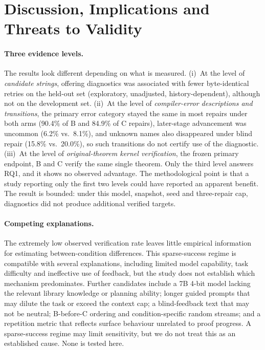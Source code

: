 \documentclass[runningheads,a4paper]{llncs}
\begin{document}
\section{Discussion, Implications and Threats to Validity}
\paragraph{Three evidence levels.} The results look different depending on what is
measured. (i)~At the level of \emph{candidate strings}, offering diagnostics was
associated with fewer byte-identical retries on the held-out set (exploratory,
unadjusted, history-dependent), although not on the development set. (ii)~At the
level of \emph{compiler-error descriptions and transitions}, the primary error category stayed the same in most repairs under both arms (90.4\% of B and 84.9\% of C repairs), later-stage advancement was uncommon (6.2\% vs.\ 8.1\%), and unknown names also disappeared under blind repair (15.8\% vs.\ 20.0\%), so such transitions do not certify use of the diagnostic. (iii)~At the level of
\emph{original-theorem kernel verification}, the frozen primary endpoint, B and C
verify the same single theorem. Only the third level answers RQ1, and it shows no
observed advantage. The methodological point is that a study reporting only the
first two levels could have reported an apparent benefit. The result is bounded:
under this model, snapshot, seed and three-repair cap, diagnostics did not produce
additional verified targets.

\paragraph{Competing explanations.} The extremely low observed verification rate leaves little empirical information for estimating between-condition differences. This sparse-success regime is compatible with several explanations, including limited model capability, task difficulty and ineffective use of feedback, but the study does not establish which mechanism predominates. Further candidates include a 7B 4-bit model lacking the relevant library knowledge or planning ability; longer guided prompts that may dilute the task or exceed the context cap; a blind-feedback text that may not be neutral; B-before-C ordering and condition-specific random streams; and a repetition metric that reflects surface behaviour unrelated to proof progress. A sparse-success regime may limit sensitivity, but we do not treat this as an established cause. None is tested here.
\end{document}

